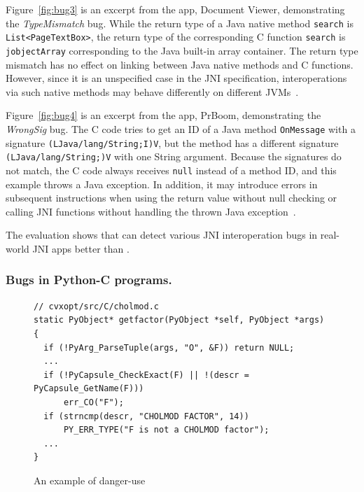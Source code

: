 Figure~\ref{fig:bug3} is an excerpt from the app, Document Viewer,
demonstrating the {\it TypeMismatch} bug.
While the return type of a Java native method {\tt search}
is {\tt List<PageTextBox>}, the return type of the corresponding C function
{\tt search} is {\tt jobjectArray} corresponding to the Java built-in array
container. The return type mismatch has no effect on linking between
Java native methods and C functions. However, since it is an unspecified case in
the JNI specification, interoperations via such native methods may behave
differently on different JVMs~\cite{LeeASE20}. 


Figure~\ref{fig:bug4} is an excerpt from the app, PrBoom, demonstrating the
{\it WrongSig} bug.
The C code tries to get an ID of a Java method {\tt OnMessage} with a
signature \texttt{(LJava/lang/String;I)V}, but the method has a different
signature \texttt{(LJava/lang/String;)V} with one String argument. Because
the signatures do not match, the C code always receives {\tt null}
instead of a method ID, and this example throws a Java exception. In
addition, it may introduce errors in subsequent instructions when using the
return value without null checking or calling JNI functions without handling the
thrown Java exception~\cite{jniexcept}.

The evaluation shows that \ours can detect various JNI interoperation bugs in
real-world JNI apps better than \lees.

\subsubsection{Bugs in Python-C programs.}



\begin{figure}[ht!]
  \centering
  \vspace{2mm}
  \begin{lstlisting}[style=cpp,xleftmargin=2.5em]
// cvxopt/src/C/cholmod.c
static PyObject* getfactor(PyObject *self, PyObject *args)
{
  if (!PyArg_ParseTuple(args, "O", &F)) return NULL;
  ...
  if (!PyCapsule_CheckExact(F) || !(descr = PyCapsule_GetName(F)))
      err_CO("F");
  if (strncmp(descr, "CHOLMOD FACTOR", 14))
      PY_ERR_TYPE("F is not a CHOLMOD factor");
  ...
}
  \end{lstlisting}
    \vspace*{-.5em}
  \caption{An example of danger-use}
  \label{fig:cvxopt}
\end{figure}

